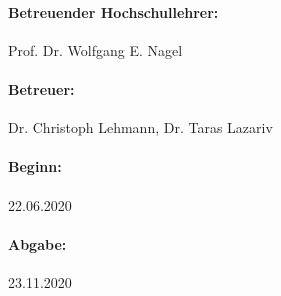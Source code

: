 \paragraph{Betreuender Hochschullehrer:\hspace{60pt}} Prof. Dr. Wolfgang E. Nagel
\paragraph{Betreuer:\hspace{168.5pt}} Dr. Christoph Lehmann, Dr. Taras Lazariv
\paragraph{Beginn:\hspace{176.5pt}} 22.06.2020
\paragraph{Abgabe:\hspace{173.5pt}} 23.11.2020